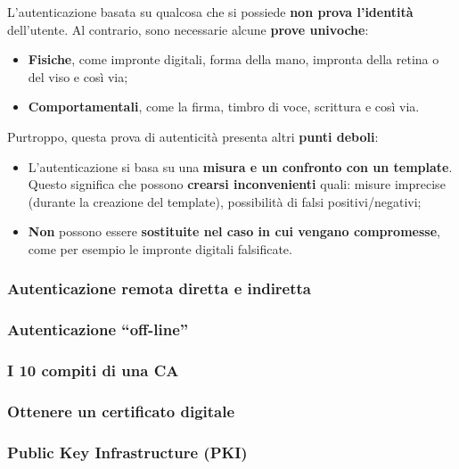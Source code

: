 \documentclass[a4paper]{article}
\newcommand{\dquotes}[1]{``#1''}
\begin{document}
	L'autenticazione basata su qualcosa che si possiede \textbf{non prova l'identità} dell'utente. Al contrario, sono necessarie alcune \textbf{prove univoche}:
	\begin{itemize}
		\item \textcolor{Red3}{\textbf{Fisiche}}, come impronte digitali, forma della mano, impronta della retina o del viso e così via;
		
		\item \textcolor{Red3}{\textbf{Comportamentali}}, come la firma, timbro di voce, scrittura e così via.
	\end{itemize}
	Purtroppo, questa prova di autenticità presenta altri \textbf{punti deboli}:
	\begin{itemize}
		\item L'autenticazione si basa su una \textbf{misura e un confronto con un template}. Questo significa che possono \textbf{crearsi inconvenienti} quali: misure imprecise (durante la creazione del template), possibilità di falsi positivi/negativi;
		
		\item \textbf{Non} possono essere \textbf{sostituite nel caso in cui vengano compromesse}, come per esempio le impronte digitali falsificate.
	\end{itemize}\newpage
	
	\subsubsection{Autenticazione remota diretta e indiretta}
	
	\subsubsection{Autenticazione \dquotes{off-line}}
	
	\subsubsection{I 10 compiti di una CA}
	
	\subsubsection{Ottenere un certificato digitale}
	
	\subsubsection{Public Key Infrastructure (PKI)}
	
\end{document}
